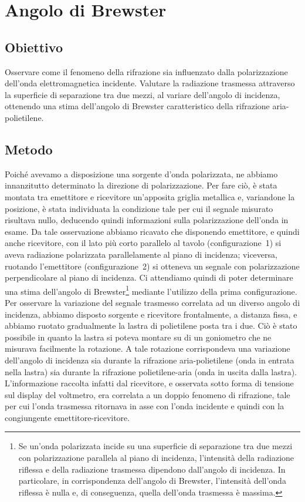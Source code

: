 \documentclass[a4paper]{article}
\begin{document}
\section{Angolo di Brewster}
\subsection{Obiettivo}
Osservare come il fenomeno della rifrazione sia influenzato dalla polarizzazione dell'onda elettromagnetica incidente. Valutare la radiazione trasmessa attraverso la superficie di separazione tra due mezzi, al variare dell'angolo di incidenza, ottenendo una stima dell'angolo di Brewster caratteristico della rifrazione aria-polietilene. 

\subsection{Metodo}
Poiché avevamo a disposizione una sorgente d'onda polarizzata, ne abbiamo innanzitutto determinato la direzione di polarizzazione. Per fare ciò, è stata montata tra emettitore e ricevitore un'apposita griglia metallica e, variandone la posizione, è stata individuata la condizione tale per cui il segnale misurato risultava nullo, deducendo quindi informazioni sulla polarizzazione dell'onda in esame. Da tale osservazione abbiamo ricavato che disponendo emettitore, e quindi anche ricevitore, con il lato più corto parallelo al tavolo (configurazione~1) si aveva radiazione polarizzata parallelamente al piano di incidenza; viceversa, ruotando l'emettitore (configurazione~2) si otteneva un segnale con polarizzazione perpendicolare al piano di incidenza. Ci attendiamo quindi di poter determinare una stima dell'angolo di Brewster\footnote{Se un'onda polarizzata incide su una superficie di separazione tra due mezzi con polarizzazione parallela al piano di incidenza, l'intensità della radiazione riflessa e della radiazione trasmessa dipendono dall'angolo di incidenza. In particolare, in corrispondenza dell'angolo di Brewster, l'intensità dell'onda riflessa è nulla e, di conseguenza, quella dell'onda trasmessa è massima.} mediante l'utilizzo della prima configurazione.
Per osservare la variazione del segnale trasmesso correlata ad un diverso angolo di incidenza, abbiamo disposto sorgente e ricevitore frontalmente, a distanza fissa, e abbiamo ruotato gradualmente la lastra di polietilene posta tra i due. Ciò è stato possibile in quanto la lastra si poteva montare su di un goniometro che ne misurava facilmente la rotazione. A tale rotazione corrispondeva una variazione dell'angolo di incidenza sia durante la rifrazione aria-polietilene (onda in entrata nella lastra) sia durante la rifrazione polietilene-aria (onda in uscita dalla lastra). L'informazione raccolta infatti dal ricevitore, e osservata sotto forma di tensione sul display del voltmetro, era correlata a un doppio fenomeno di rifrazione, tale per cui l'onda trasmessa ritornava in asse con l'onda incidente e quindi con la congiungente emettitore-ricevitore. 
\end{document}

